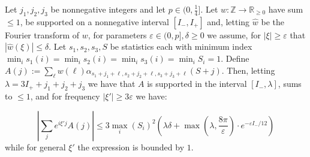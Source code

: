 \documentclass[11pt]{article}
\theoremstyle{plain}
\newcommand{\eps}{\varepsilon}
\begin{document}
\begin{lemma}\label{lem:fourier-alpha}
Let $j_1,j_2,j_3$ be nonnegative integers and let $p\in(0,\frac{1}{4}]$. Let $w:\mathbb{Z}\rightarrow\mathbb{R}_{\geq 0}$ have sum $\leq 1$, be supported on a nonnegative interval $[I_-,I_+]$ and, letting $\hat{w}$ be the Fourier transform of $w$, for parameters $\eps\in(0,p], \delta\geq 0$ we assume, for $|\xi|\geq \eps$ that $|\hat{w}(\xi)|\leq \delta$. Let $s_1,s_2,s_3,S$ be statistics each with minimum index $\min_i s_1(i)=\min_i s_2(i)=\min_i s_3(i)=\min_i S_i=1$.  Define $A(j):=\sum_{\ell} w(\ell)\alpha_{s_1+j_1+\ell,s_2+j_2+\ell,s_3+j_3+\ell}(S+j)$. Then, letting $\lambda=3I_++j_1+j_2+j_3$ we have that $A$ is supported in the interval $[I_-,\lambda]$, sums to $\leq 1$, and for frequency $|\xi'|\geq 3\eps$ we have:

\begin{equation}\label{eq:fourier-alpha}\left|\sum_{j} e^{i\xi' j}A(j)\right|\leq 3\max_i(S_i)^2\left(\lambda\delta+\max(\lambda,\frac{8\pi}{\eps})\cdot e^{-\eps I_-/12}\right)
\end{equation}
while for general $\xi'$ the expression is bounded by $1$.
\end{lemma}
\end{document}
